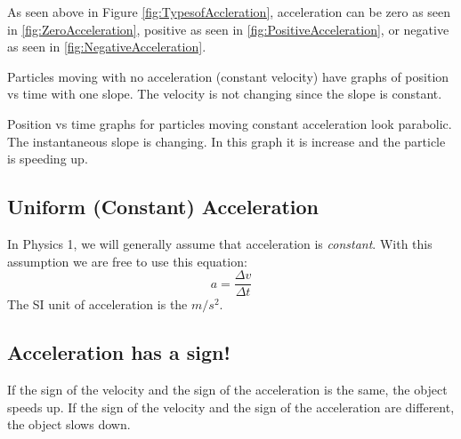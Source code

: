 As seen above in Figure \ref{fig:TypesofAccleration}, acceleration can be zero as seen in \ref{fig:ZeroAcceleration}, positive as seen in \ref{fig:PositiveAcceleration}, or negative as seen in \ref{fig:NegativeAcceleration}. 

Particles moving with no acceleration (constant velocity) have graphs of position vs time with one slope. The velocity is not changing since the slope is constant.
		
Position vs time graphs for particles moving constant acceleration look parabolic. The instantaneous slope is changing. In this graph it is increase and the particle is speeding up.
	
\subsection{Uniform (Constant) Acceleration}
In Physics 1, we will generally assume that acceleration is \textit{constant}. With this assumption we are free to use this equation: \[a=\frac{\Delta v}{\Delta t}\] 
The SI unit of acceleration is the $m/s^2$.
	
\subsection{Acceleration has a sign!}
If the sign of the velocity and the sign of the acceleration is the same, the object speeds up. If the sign of the velocity and the sign of the acceleration are different, the object slows down.